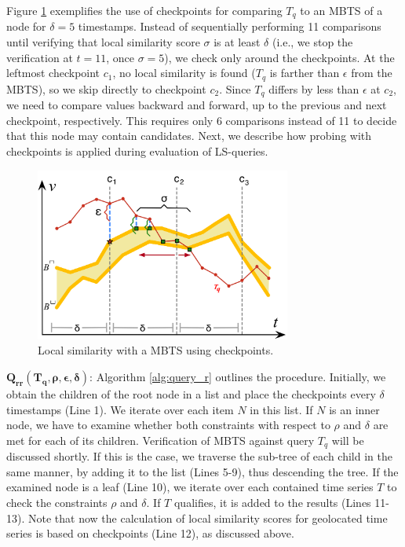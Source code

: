 Figure \ref{fig:sim_mbts_checkpoints} exemplifies the use of checkpoints for comparing $T_q$ to an MBTS of a node for $\delta=5$ timestamps. Instead of sequentially performing 11 comparisons until verifying that local similarity score $\sigma$ is at least $\delta$ (i.e., we stop the verification at $t=11$, once $\sigma=5$), we check only around the checkpoints. At the leftmost checkpoint $c_1$, no local similarity is found ($T_q$ is farther than $\epsilon$ from the MBTS), so we skip directly to checkpoint $c_2$. Since $T_q$ differs by less than $\epsilon$ at $c_2$, we need to compare values backward and forward, up to the previous and next checkpoint, respectively. This requires only 6 comparisons instead of 11 to decide that this node may contain candidates. Next, we describe how probing with checkpoints is applied during evaluation of LS-queries.

\begin{figure}[!tb]
    \centering
    \includegraphics[width=0.75\textwidth]{Figures/sim_mbts_checkpoints.png}
    \caption{Local similarity with a MBTS using checkpoints.}
    \label{fig:sim_mbts_checkpoints}
\end{figure}

\noindent $\mathbold{Q_{rr}(T_q, \rho, \epsilon, \delta)}$: Algorithm \ref{alg:query_r} outlines the procedure. Initially, we obtain the children of the root node in a list and place the checkpoints every $\delta$ timestamps (Line 1). We iterate over each item $N$ in this list. If $N$ is an inner node, we have to examine whether both constraints with respect to $\rho$ and $\delta$ are met for each of its children. Verification of MBTS against query $T_q$ will be discussed shortly. If this is the case, we traverse the sub-tree of each child in the same manner, by adding it to the list (Lines 5-9), thus descending the tree. If the examined node is a leaf (Line 10), we iterate over each contained time series $T$ to check the constraints $\rho$ and $\delta$. If $T$ qualifies, it is added to the results (Lines 11-13). Note that now the calculation of local similarity scores for geolocated time series is based on checkpoints (Line 12), as discussed above.

